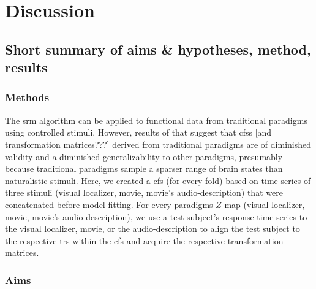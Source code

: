 




\section{Discussion}


\subsection{Short summary of aims \& hypotheses, method, results}


\subsubsection{Methods}

The \ac{srm} algorithm can be applied to functional data from traditional
paradigms using controlled stimuli.
%
However, results of \citet{haxby2011common} that suggest that \acp{cfs} [and
transformation matrices???] derived from traditional paradigms are of diminished
validity and a diminished generalizability to other paradigms, presumably
because traditional paradigms sample a sparser range of brain states than
naturalistic stimuli.
%
Here, we created a \ac{cfs} (for every fold) based on time-series of three
stimuli (visual localizer, movie, movie's audio-description) that were
concatenated before model fitting.
%
For every paradigms $Z$-map (visual localizer, movie, movie's
audio-description), we use a test subject's response time series to the visual
localizer, movie, or the audio-description to align the test subject to the
respective \acp{tr} within the \ac{cfs} and acquire the respective
transformation matrices.


\subsubsection{Aims}



